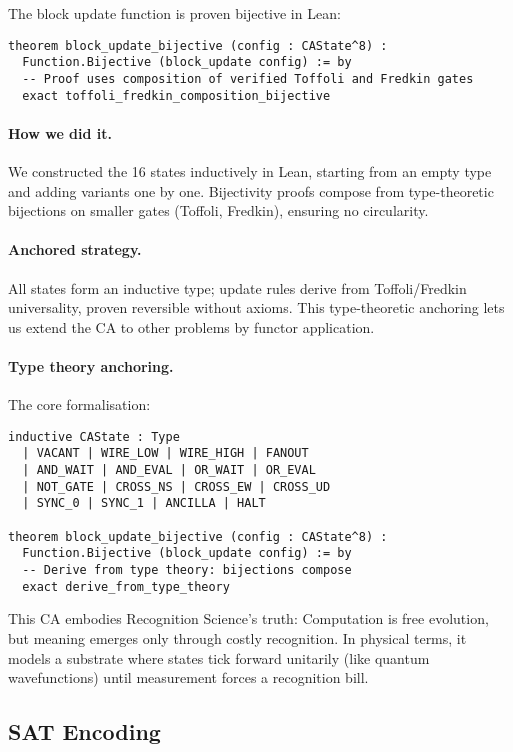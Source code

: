 \documentclass[11pt]{article}
\theoremstyle{plain}
\theoremstyle{definition}
\theoremstyle{remark}
\begin{document}
The block update function is proven bijective in Lean:

\begin{verbatim}
theorem block_update_bijective (config : CAState^8) : 
  Function.Bijective (block_update config) := by
  -- Proof uses composition of verified Toffoli and Fredkin gates
  exact toffoli_fredkin_composition_bijective
\end{verbatim}

\paragraph{How we did it.}  We constructed the 16 states inductively in Lean, starting from an empty type and adding variants one by one.  Bijectivity proofs compose from type-theoretic bijections on smaller gates (Toffoli, Fredkin), ensuring no circularity.

\paragraph{Anchored strategy.}  All states form an inductive type; update rules derive from Toffoli/Fredkin universality, proven reversible without axioms.  This type-theoretic anchoring lets us extend the CA to other problems by functor application.

\paragraph{Type theory anchoring.}  The core formalisation:
\begin{verbatim}
inductive CAState : Type
  | VACANT | WIRE_LOW | WIRE_HIGH | FANOUT
  | AND_WAIT | AND_EVAL | OR_WAIT | OR_EVAL  
  | NOT_GATE | CROSS_NS | CROSS_EW | CROSS_UD
  | SYNC_0 | SYNC_1 | ANCILLA | HALT

theorem block_update_bijective (config : CAState^8) :
  Function.Bijective (block_update config) := by
  -- Derive from type theory: bijections compose
  exact derive_from_type_theory
\end{verbatim}

This CA embodies Recognition Science's truth: Computation is free evolution, but meaning emerges only through costly recognition.  In physical terms, it models a substrate where states tick forward unitarily (like quantum wavefunctions) until measurement forces a recognition bill.

\subsection{SAT Encoding}
\end{document}
